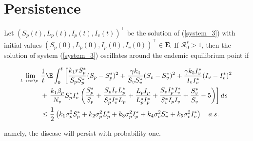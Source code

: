 \section{Persistence}

\begin{theorem}\label{theorem_3}
	Let $(S_p(t),L_p(t),I_p(t),I_v(t))^{\top}$ be the solution of (\ref{system_3}) with initial values $(S_p(0),L_p(0),I_p(0),I_v(0))^{\top}\in \mathbf{E}$. If $\mathcal{R}^s_0>1$, then the solution of system (\ref{system_3}) oscillates around the endemic equilibrium point if
	
	\begin{align*}	
		\lim\limits_{t\rightarrow \infty¸}&\frac{1}{t}\E \int_{0}^{t} \left[\frac{k_1rS_p^*}{S_pS_p^*}(S_p-S_p^*)^2+\frac{\gamma k_4}{S_vS_v^*}(S_v-S_v^*)^2+\frac{\gamma k_5 I_v^*}{I_vI_v^*}(I_v-I_v^*)^2\right.\\
		&+
		\left.\frac{k_1\beta_p}{N_v}S_p^*I_v^*\left(\frac{S_p^*}{S_p}+\frac{S_pI_vL_p^*}{S_p^*I_v^*L_p}+\frac{L_pI_p}{L_p^*I_p^*}+\frac{S_vI_p^*I_v^*}{S_v^*I_pI_v}+\frac{S_v^*}{S_v}-5\right)\right]ds\\
		&\leq
		\frac{1}{2}\left(k_1\sigma_p^2S_p^*+k_2\sigma_p^2 L_p^*+k_3\sigma_p^2I_p^*+k_4\sigma_v^2S_v^*+k_5\sigma_v^2I_v^*\right) \quad a.s.
	\end{align*}
	
	namely, the disease will persist with probability one.
\end{theorem}
